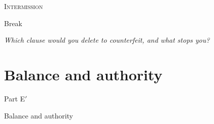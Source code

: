 \documentclass[aspectratio=169,11pt]{beamer}
\newcommand{\Ep}{\ensuremath{\mathcal{E}}}
\newcommand{\divider}[2]{%
  \section{#2}
  \begin{frame}[plain,t]
  \vspace*{14mm}
  {\small\color{arb}#1\par}
  \vskip8mm
  \begin{minipage}{0.88\textwidth}\raggedright
    \fontsize{27}{31}\selectfont #2\par
  \end{minipage}
  \end{frame}}
\begin{document}
\begin{frame}[plain,t]
\vspace*{14mm}
{\small\scshape\color{arb}Intermission\par}
\vskip8mm
{\fontsize{27}{31}\selectfont Break\par}
\vskip6mm
\begin{minipage}{0.8\textwidth}\raggedright\itshape
Which clause would you delete to counterfeit, and what stops you?
\end{minipage}
\end{frame}

\newcommand{\Epbvk}{\ensuremath{\mathsf{bvk}}}
\newcommand{\Epbsk}{\ensuremath{\mathsf{bsk}}}
\newcommand{\Epvbal}{\ensuremath{v_{\mathrm{balance}}}}
\newcommand{\Epvold}{\ensuremath{v_{\mathrm{old}}}}
\newcommand{\Epvnew}{\ensuremath{v_{\mathrm{new}}}}
\newcommand{\EpSA}{\ensuremath{G^{\mathsf{SpendAuth}}}}
\newcommand{\EpZ}{\ensuremath{\mathbb{Z}}}

\divider{Part E$'$}{Balance and authority}
\end{document}
